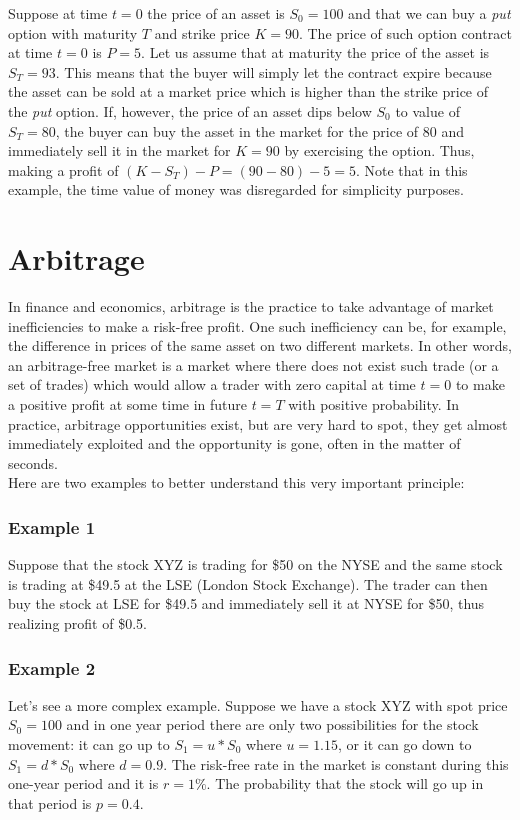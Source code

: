 \documentclass[times, utf8, diplomski]{fer}
\begin{document}
\hfill \break
\indent \noindent Suppose at time $t=0$ the price of an asset is $S_0 = 100$ and that we can buy a \textit{put} option with maturity $T$ and strike price $K=90$. The price of such option contract at time $t=0$ is $P = 5$. Let us assume that at maturity the price of the asset is $S_T = 93$. This means that the buyer will simply let the contract expire because the asset can be sold at a market price which is higher than the strike price of the \textit{put} option. If, however, the price of an asset dips below $S_0$ to value of $S_T = 80$, the buyer can buy the asset in the market for the price of $80$ and immediately sell it in the market for $K=90$ by exercising the option. Thus, making a profit of $(K-S_T) - P = (90 - 80) - 5 = 5$. 
\hfill \break
Note that in this example, the time value of money was disregarded for simplicity purposes. 

\section{Arbitrage}
In finance and economics, arbitrage is the practice to take advantage of market inefficiencies to make a risk-free profit. One such inefficiency can be, for example, the difference in prices of the same asset on two different markets. In other words, an arbitrage-free market is a market where there does not exist such trade (or a set of trades) which would allow a trader with zero capital at time $t=0$ to make a positive profit at some time in future $t=T$ with positive probability. In practice, arbitrage opportunities exist, but are very hard to spot, they get almost immediately exploited and the opportunity is gone, often in the matter of seconds.\\Here are two examples to better understand this very important principle:
\subsubsection{Example 1}
Suppose that the stock XYZ is trading for \$50 on the NYSE and the same stock is trading at \$49.5 at the LSE (London Stock Exchange). The trader can then buy the stock at LSE for \$49.5 and immediately sell it at NYSE for \$50, thus realizing profit of \$0.5. 
\subsubsection{Example 2}
Let's see a more complex example. Suppose we have a stock XYZ with spot price $S_0 = 100$ and in one year period there are only two possibilities for the stock movement: it can go up to $S_1 = u * S_0$ where $u=1.15$, or it can go down to $S_1 = d * S_0$ where $d=0.9$. The risk-free rate in the market is constant during this one-year period and it is $r=1\%$. The probability that the stock will go up in that period is $p=0.4$. 
\end{document}

